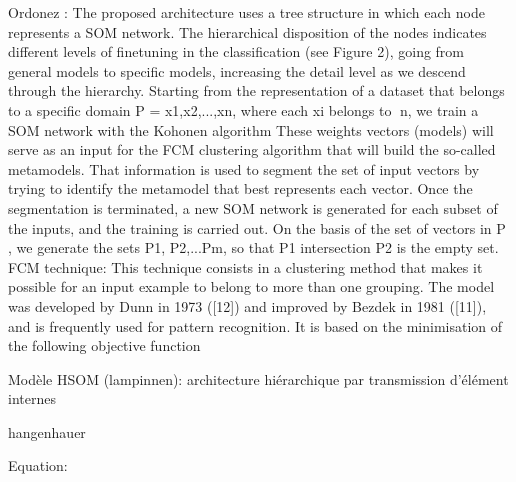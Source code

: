 Ordonez : The proposed architecture uses a tree structure in which each node represents a SOM network. The hierarchical disposition of the nodes indicates different levels of finetuning in the classification (see Figure 2), going from general models to specific models, increasing the detail level as we descend through the hierarchy.
Starting from the representation of a dataset that belongs to a specific domain P = x1,x2,...,xn, where each xi belongs to n, we train a SOM network with the Kohonen algorithm
These weights vectors (models) will serve as an input for the FCM clustering algorithm that will build the so-called metamodels. That information is used to segment the set of input vectors by trying to identify the metamodel that best represents each vector.
Once the segmentation is terminated, a new SOM network is generated for each subset of the inputs, and the training is carried out. On the basis of the set of vectors in P , we generate the sets P1, P2,...Pm, so that P1 intersection P2 is the empty set. FCM technique: This technique consists in a clustering method that makes it possible for an input example to belong to more than one grouping. The model was developed by Dunn in 1973 ([12]) and improved by Bezdek in 1981 ([11]), and is frequently used for pattern recognition. It is based on the minimisation of the following objective function


Modèle HSOM (lampinnen): architecture hiérarchique par transmission d'élément internes

hangenhauer

Equation: 






